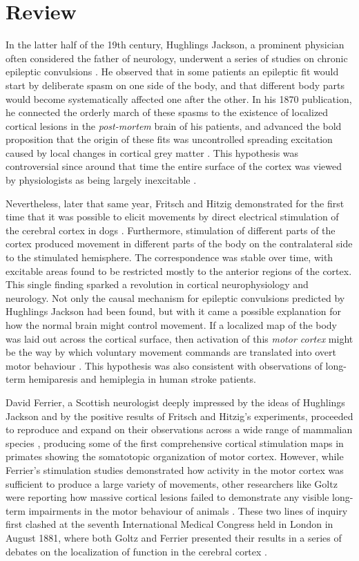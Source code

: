 \section{Review}

In the latter half of the 19th century, Hughlings Jackson, a prominent physician often considered the father of neurology, underwent a series of studies on chronic epileptic convulsions \cite{Jackson1870}. He observed that in some patients an epileptic fit would start by deliberate spasm on one side of the body, and that different body parts would become systematically affected one after the other. In his 1870 publication, he connected the orderly march of these spasms to the existence of localized cortical lesions in the \emph{post-mortem} brain of his patients, and advanced the bold proposition that the origin of these fits was uncontrolled spreading excitation caused by local changes in cortical grey matter \cite{Jackson1870}. This hypothesis was controversial since around that time the entire surface of the cortex was viewed by physiologists as being largely inexcitable \cite{Gross2007}.

Nevertheless, later that same year, Fritsch and Hitzig demonstrated for the first time that it was possible to elicit movements by direct electrical stimulation of the cerebral cortex in dogs \cite{Fritsch1870}. Furthermore, stimulation of different parts of the cortex produced movement in different parts of the body on the contralateral side to the stimulated hemisphere. The correspondence was stable over time, with excitable areas found to be restricted mostly to the anterior regions of the cortex. This single finding sparked a revolution in cortical neurophysiology and neurology. Not only the causal mechanism for epileptic convulsions predicted by Hughlings Jackson had been found, but with it came a possible explanation for how the normal brain might control movement. If a localized map of the body was laid out across the cortical surface, then activation of this \emph{motor cortex} might be the way by which voluntary movement commands are translated into overt motor behaviour \cite{Fritsch1870}. This hypothesis was also consistent with observations of long-term hemiparesis and hemiplegia in human stroke patients.

David Ferrier, a Scottish neurologist deeply impressed by the ideas of Hughlings Jackson and by the positive results of Fritsch and Hitzig's experiments, proceeded to reproduce and expand on their observations across a wide range of mammalian species \cite{Ferrier1873}, producing some of the first comprehensive cortical stimulation maps in primates showing the somatotopic organization of motor cortex. However, while Ferrier's stimulation studies demonstrated how activity in the motor cortex was sufficient to produce a large variety of movements, other researchers like Goltz were reporting how massive cortical lesions failed to demonstrate any visible long-term impairments in the motor behaviour of animals \cite{Goltz1888}. These two lines of inquiry first clashed at the seventh International Medical Congress held in London in August 1881, where both Goltz and Ferrier presented their results in a series of debates on the localization of function in the cerebral cortex \cite{Tyler2000}.

